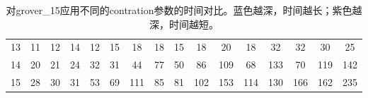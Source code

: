 \begin{table}[!htbp]
{\begin{tabular}{c|ccccccccccccccc}
        \rowcolor[HTML]{8DB4E2} 
        \cellcolor[HTML]{FFFFFF}13 & 11                                               & 12                          & 14                          & 12                          & 15                          & 18                                               & 18                         & 15                          & 18                          & 20                          & 18                          & 32                          & 32                          & 30                          & 25                          \\
        \rowcolor[HTML]{8DB4E2} 
        \cellcolor[HTML]{FFFFFF}14 & 20                                               & 21                          & 24                          & 32                          & 31                          & 44                                               & 77                         & 50                          & 86                          & \cellcolor[HTML]{538DD5}109 & 68                          & \cellcolor[HTML]{538DD5}133 & 70                          & \cellcolor[HTML]{538DD5}119 & \cellcolor[HTML]{538DD5}142 \\
        \rowcolor[HTML]{538DD5} 
        \cellcolor[HTML]{FFFFFF}15 & \cellcolor[HTML]{8DB4E2}28                       & \cellcolor[HTML]{8DB4E2}30  & \cellcolor[HTML]{8DB4E2}31  & \cellcolor[HTML]{8DB4E2}53  & \cellcolor[HTML]{8DB4E2}69  & 111                                              & \cellcolor[HTML]{8DB4E2}85 & \cellcolor[HTML]{8DB4E2}81  & 102                         & 153                         & 114                         & 130                         & 166                         & 162                         & 235                        
                         
        \end{tabular}
    }
    \caption{对grover\_15应用不同的contration参数的时间对比。蓝色越深，时间越长；紫色越深，时间越短。}%
    \label{table-contraction}
\end{table}

